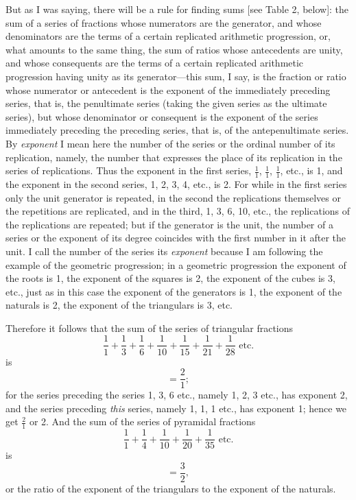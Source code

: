 \documentclass[polutonikogreek,english,twoside,openright]{article}
\begin{document}
But as I was saying, there will be a rule for finding sums [see Table 2, below]: the sum of a series of fractions whose numerators are the generator, and whose
denominators are the terms of a certain replicated arithmetic progression, or,
what amounts to the same thing, the sum of ratios whose antecedents are unity,
and whose consequents are the terms of a certain replicated arithmetic
progression having unity as its generator---this sum, I say, is the fraction
or ratio whose numerator or antecedent is the exponent of the immediately
preceding series, that is, the penultimate series (taking the given
series as the ultimate series), but whose denominator or consequent is the
exponent of the series immediately preceding the preceding series, that is, of
the antepenultimate series.  By {\em exponent} I mean here the number of the
series or the ordinal number of its replication, namely, the number that
expresses the place of its replication in the series of replications.  Thus
the exponent in the first series, $\frac{1}{1}$, $\frac{1}{1}$, $\frac{1}{1}$,
etc., is 1, and the exponent in the second series, 1, 2, 3, 4, etc., is 2.
For while in the first series only the unit generator is repeated, in the
second the replications themselves or the repetitions are replicated, and in
the third, 1, 3, 6, 10, etc., the replications of the replications are
repeated; but if the generator is the unit, the number of a series or the
exponent of its degree coincides with the first number in it after the unit.
I call the number of the series its  {\em exponent} because I am following the example of the geometric
progression; in a geometric progression the exponent of the roots is 1, the exponent of the squares is 2,
the exponent of the cubes is 3, etc., just as in this case the exponent of the generators is 1, the exponent of
the naturals is 2, the exponent of the triangulars is 3, etc.

Therefore it follows that the sum of the series of triangular fractions
$$\frac{1}{1} + \frac{1}{3} + \frac{1}{6} + \frac{1}{10} +\frac{1}{15} +
\frac{1}{21} +\frac{1}{28} \mbox{ etc.}$$
 is $$=\frac{2}{1};$$ for the series
preceding the series 1, 3, 6 etc., namely 1, 2, 3 etc., has exponent 2, and
the series preceding {\em this} series, namely 1, 1, 1 etc., has exponent 1;
hence we get $\frac{2}{1}$ or 2.  And the sum of the series of pyramidal
fractions $$\frac{1}{1} + \frac{1}{4} + \frac{1}{10} + \frac{1}{20}
+\frac{1}{35} \mbox{ etc.}$$ is $$=\frac{3}{2},$$ or the ratio of the exponent of
the triangulars to the exponent of the naturals.
\end{document}
